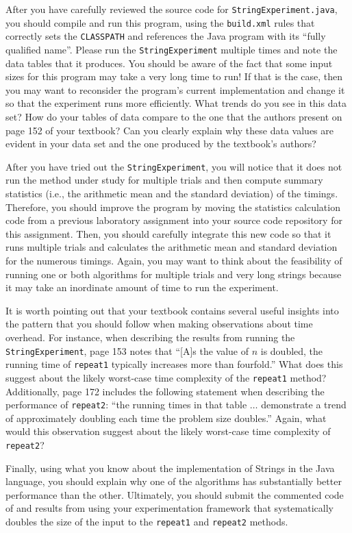 After you have carefully reviewed the source code for {\tt StringExperiment.java}, you should compile and run this
program, using the {\tt build.xml} rules that correctly sets the {\tt CLASSPATH} and references the Java program with
its ``fully qualified name''. Please run the {\tt StringExperiment} multiple times and note the data tables that it
produces. You should be aware of the fact that some input sizes for this program may take a very long time to run! If
that is the case, then you may want to reconsider the program's current implementation and change it so that the
experiment runs more efficiently. What trends do you see in this data set? How do your tables of data compare to the one
that the authors present on page 152 of your textbook? Can you clearly explain why these data values are evident in your
data set and the one produced by the textbook's authors?

After you have tried out the {\tt StringExperiment}, you will notice that it does not run the method under study for
multiple trials and then compute summary statistics (i.e., the arithmetic mean and the standard deviation) of the
timings. Therefore, you should improve the program by moving the statistics calculation code from a previous laboratory
assignment into your source code repository for this assignment.  Then, you should carefully integrate this new code so
that it runs multiple trials and calculates the arithmetic mean and standard deviation for the numerous timings. Again,
you may want to think about the feasibility of running one or both algorithms for multiple trials and very long strings
because it may take an inordinate amount of time to run the experiment.

It is worth pointing out that your textbook contains several useful insights into the pattern that you should follow
when making observations about time overhead. For instance, when describing the results from running the {\tt
StringExperiment}, page 153 notes that ``[A]s the value of $n$ is doubled, the running time of {\tt repeat1} typically
increases more than fourfold.'' What does this suggest about the likely worst-case time complexity of the {\tt repeat1}
method? Additionally, page 172 includes the following statement when describing the performance of {\tt repeat2}: ``the
running times in that table $\ldots$ demonstrate a trend of approximately doubling each time the problem size doubles.''
Again, what would this observation suggest about the likely worst-case time complexity of {\tt repeat2}?

Finally, using what you know about the implementation of Strings in the Java language, you should explain why one of the
algorithms has substantially better performance than the other. Ultimately, you should submit the commented code of and
results from using your experimentation framework that systematically doubles the size of the input to the {\tt repeat1} and
{\tt repeat2} methods.

